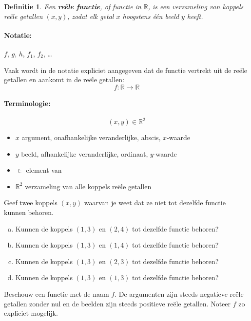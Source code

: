 \documentclass[12pt,a4paper,twoside]{article}
\newtheorem{definition}{Definitie}
\begin{document}
\begin{definition}
  Een {\bf reële functie}, of functie in $\mathbb{R}$, is een verzameling van {\em koppels} reële getallen $(x,y)$, zodat elk getal $x$ {\em hoogstens één beeld} $y$ heeft.
\end{definition}

\paragraph{Notatie:} $f$, $g$, $h$, $f_1$, $f_2$, \ldots

Vaak wordt in de notatie expliciet aangegeven dat de functie vertrekt uit de reële getallen en aankomt in de reële getallen:
$$f:\mathbb{R}\to\mathbb{R}$$

\paragraph{Terminologie:}
$$(x,y) \in \mathbb{R}^2$$
\begin{itemize}
  \item $x$ argument, onafhankelijke veranderlijke, abscis, $x$-waarde
  \item $y$ beeld, afhankelijke veranderlijke, ordinaat, $y$-waarde
  \item $\in$ element van
  \item $\mathbb{R}^2$ verzameling van alle koppels reële getallen
\end{itemize}

\begin{oefening}
  Geef twee koppels $(x,y)$ waarvan je weet dat ze niet tot dezelfde functie kunnen behoren.
\end{oefening}

\begin{oefening}
\begin{enumerate}[(a)]
  \item Kunnen de koppels $(1,3)$ en $(2,4)$ tot dezelfde functie behoren?
  \item Kunnen de koppels $(1,3)$ en $(1,4)$ tot dezelfde functie behoren?
  \item Kunnen de koppels $(1,3)$ en $(2,3)$ tot dezelfde functie behoren?
  \item Kunnen de koppels $(1,3)$ en $(1,3)$ tot dezelfde functie behoren?
\end{enumerate}
\end{oefening}

\begin{oefening}
  Beschouw een functie met de naam $f$. De argumenten zijn steeds negatieve reële getallen zonder nul en de beelden zijn steeds positieve reële getallen. Noteer $f$ zo expliciet mogelijk.
\end{oefening}
\end{document}
